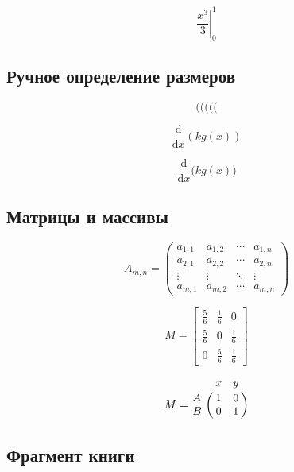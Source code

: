 \begin{equation}
\left.\frac{x^3}{3}\right|_0^1
\end{equation}

\subsection{Ручное определение размеров}
\begin{equation}
( \big( \Big( \bigg( \Bigg(
\end{equation}

\begin{equation}
\frac{\mathrm d}{\mathrm d x} \left( k g(x) \right)
\end{equation}

\begin{equation}
\frac{\mathrm d}{\mathrm d x} \big( k g(x) \big)
\end{equation}

\subsection{Матрицы и массивы}
\begin{equation}
A_{m,n} = 
 \begin{pmatrix}
  a_{1,1} & a_{1,2} & \cdots & a_{1,n} \\
  a_{2,1} & a_{2,2} & \cdots & a_{2,n} \\
  \vdots  & \vdots  & \ddots & \vdots  \\
  a_{m,1} & a_{m,2} & \cdots & a_{m,n} 
 \end{pmatrix}
\end{equation}

\begin{equation}
M = \begin{bmatrix}
       \frac{5}{6} & \frac{1}{6} & 0           \\[0.3em]
       \frac{5}{6} & 0           & \frac{1}{6} \\[0.3em]
       0           & \frac{5}{6} & \frac{1}{6}
     \end{bmatrix}
\end{equation}

\begin{equation}
M = \bordermatrix{~ & x & y \cr
                  A & 1 & 0 \cr
                  B & 0 & 1 \cr}
\end{equation}

\subsection{Фрагмент книги}

